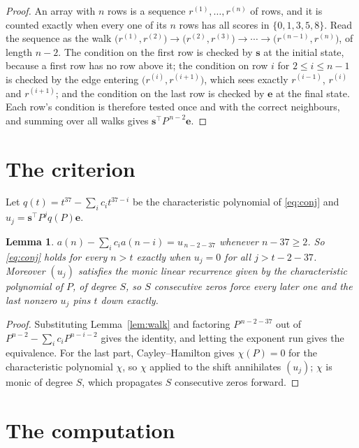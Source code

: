 \documentclass[11pt,a4paper]{article}
\theoremstyle{plain}
\newtheorem{lemma}[theorem]{Lemma}
\theoremstyle{definition}
\begin{document}
\begin{proof}
An array with $n$ rows is a sequence $r^{(1)},\dots,r^{(n)}$ of rows, and it is counted
exactly when every one of its $n$ rows has all scores in $\{0,1,3,5,8\}$. Read the sequence as the
walk $\bigl(r^{(1)},r^{(2)}\bigr)\to\bigl(r^{(2)},r^{(3)}\bigr)\to\cdots\to
\bigl(r^{(n-1)},r^{(n)}\bigr)$, of length $n-2$. The condition on the first row is
checked by $\mathbf{s}$ at the initial state, because a first row has no row above it; the
condition on row $i$ for $2\le i\le n-1$ is checked by the edge entering
$\bigl(r^{(i)},r^{(i+1)}\bigr)$, which sees exactly $r^{(i-1)}$, $r^{(i)}$ and
$r^{(i+1)}$; and the condition on the last row is checked by $\mathbf{e}$ at the final
state. Each row's condition is therefore tested once and with the correct neighbours, and
summing over all walks gives $\mathbf{s}^{\!\top}P^{\,n-2}\mathbf{e}$.
\end{proof}

\section{The criterion}

Let $q(t)=t^{37}-\sum_i c_i t^{37-i}$ be the characteristic polynomial of
\eqref{eq:conj} and $u_j=\mathbf{s}^{\!\top}P^{j}q(P)\mathbf{e}$.

\begin{lemma}\label{lem:crit}
$a(n)-\sum_i c_i a(n-i)=u_{\,n-2-37}$ whenever $n-37\ge2$. So \eqref{eq:conj}
holds for every $n>t$ exactly when $u_j=0$ for all $j>t-2-37$. Moreover $(u_j)$
satisfies the monic linear recurrence given by the characteristic polynomial of $P$, of
degree $S$, so $S$ consecutive zeros force every later one and the last nonzero $u_j$ pins
$t$ down exactly.
\end{lemma}

\begin{proof}
Substituting Lemma~\ref{lem:walk} and factoring $P^{\,n-2-37}$ out of
$P^{n-2}-\sum_i c_i P^{n-i-2}$ gives the identity, and letting the exponent run gives the
equivalence. For the last part, Cayley--Hamilton gives $\chi(P)=0$ for the characteristic
polynomial $\chi$, so $\chi$ applied to the shift annihilates $(u_j)$; $\chi$ is monic of
degree $S$, which propagates $S$ consecutive zeros forward.
\end{proof}

\section{The computation}
\end{document}

